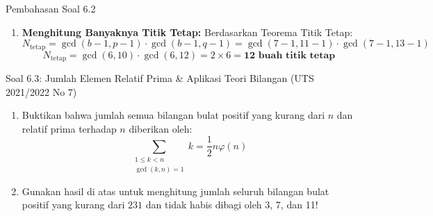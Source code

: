 \documentclass[11pt,a4paper]{article}
\begin{document}
\begin{solusibox}{Pembahasan Soal 6.2}
\begin{enumerate}[leftmargin=*]
\begin{itemize}
        $48 \equiv 4 \pmod{11}$, dan eksponen $103 \equiv 3 \pmod{10}$.
        \[
        x \equiv 4^3 = 64 = 5(11) + 9 \equiv \mathbf{9 \pmod{11}}
        \]
        \item Modulo $q = 13$: Berdasarkan Teorema Fermat Kecil ($48^{12} \equiv 1 \pmod{13}$):
        $48 \equiv 9 \equiv -4 \pmod{13}$, dan eksponen $103 \equiv 7 \pmod{12}$.
        \[
        x \equiv 9^7 \equiv (-4)^7 = -16384 \equiv 9 \pmod{13}
        \]
        (Periksa: $9^2 = 81 \equiv 3$, $9^4 \equiv 9$, $9^6 \equiv 27 \equiv 1 \implies 9^7 \equiv 9 \pmod{13}$).
    \end{itemize}
    Karena $x \equiv 9 \pmod{11}$ dan $x \equiv 9 \pmod{13}$, maka menurut CRT:
    \[
    x \equiv \mathbf{9 \pmod{143}}
    \]
    Dekripsi berhasil sempurna memulihkan plaintext awal $x = 9$.
    \item \textbf{Menghitung Banyaknya Titik Tetap:}
    Berdasarkan Teorema Titik Tetap:
    \[
    N_{\text{tetap}} = \gcd(b - 1, p - 1) \cdot \gcd(b - 1, q - 1) = \gcd(7 - 1, 11 - 1) \cdot \gcd(7 - 1, 13 - 1)
    \]
    \[
    N_{\text{tetap}} = \gcd(6, 10) \cdot \gcd(6, 12) = 2 \times 6 = \mathbf{12 \text{ buah titik tetap}}
    \]
\end{enumerate}
\end{solusibox}

\vspace{0.4cm}

\begin{soalbox}{Soal 6.3: Jumlah Elemen Relatif Prima \& Aplikasi Teori Bilangan (UTS 2021/2022 No 7)}
\begin{enumerate}[label=(\alph*)]
    \item Buktikan bahwa jumlah semua bilangan bulat positif yang kurang dari $n$ dan relatif prima terhadap $n$ diberikan oleh:
    \[
    \sum_{\substack{1 \le k < n \\ \gcd(k, n) = 1}} k = \frac{1}{2} n \varphi(n)
    \]
    \item Gunakan hasil di atas untuk menghitung jumlah seluruh bilangan bulat positif yang kurang dari $231$ dan tidak habis dibagi oleh 3, 7, dan 11!
\end{enumerate}
\end{soalbox}
\end{document}
